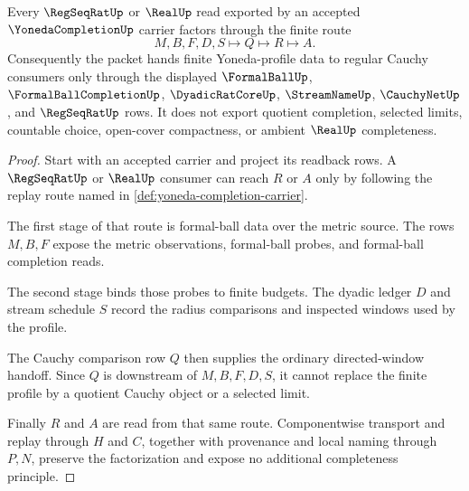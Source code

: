 \begin{theorem}
\label{thm:yoneda-completion-regular-cauchy-handoff}
Every $\RegSeqRatUp$ or $\RealUp$ read exported by an accepted $\YonedaCompletionUp$ carrier factors through the finite route
$$
M,B,F,D,S \longmapsto Q \longmapsto R \longmapsto A .
$$
Consequently the packet hands finite Yoneda-profile data to regular Cauchy consumers only through the displayed $\FormalBallUp$, $\FormalBallCompletionUp$, $\DyadicRatCoreUp$, $\StreamNameUp$, $\CauchyNetUp$, and $\RegSeqRatUp$ rows. It does not export quotient completion, selected limits, countable choice, open-cover compactness, or ambient $\RealUp$ completeness.
\end{theorem}
\begin{proof}
Start with an accepted carrier and project its readback rows. A $\RegSeqRatUp$ or $\RealUp$ consumer can reach $R$ or $A$ only by following the replay route named in \autoref{def:yoneda-completion-carrier}.

The first stage of that route is formal-ball data over the metric source. The rows $M,B,F$ expose the metric observations, formal-ball probes, and formal-ball completion reads.

The second stage binds those probes to finite budgets. The dyadic ledger $D$ and stream schedule $S$ record the radius comparisons and inspected windows used by the profile.

The Cauchy comparison row $Q$ then supplies the ordinary directed-window handoff. Since $Q$ is downstream of $M,B,F,D,S$, it cannot replace the finite profile by a quotient Cauchy object or a selected limit.

Finally $R$ and $A$ are read from that same route. Componentwise transport and replay through $H$ and $C$, together with provenance and local naming through $P,N$, preserve the factorization and expose no additional completeness principle.
\end{proof}


